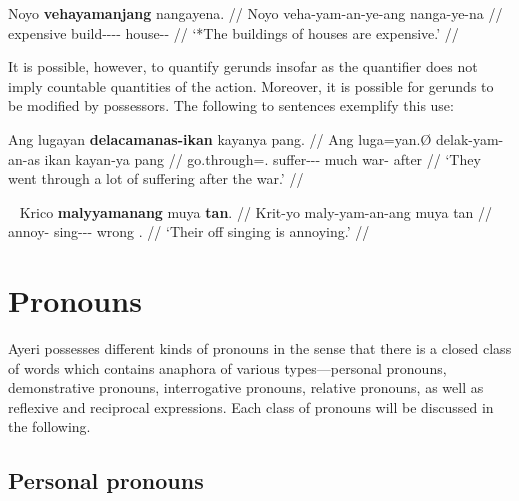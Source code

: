\ex\ljudge* \begingl
	\gla Noyo \textbf{vehayamanjang} nangayena. //
	\glb Noyo veha-yam-an-ye-ang nanga-ye-na //
	\glc expensive build-\Ptcp{}-\Nmlz{}-\Pl{}-\Aarg{} house-\Pl{}-\Gen{} //
	\glft `*The buildings of houses are expensive.' //
\endgl\xe

It is possible, however, to quantify gerunds insofar as the quantifier does not
imply countable quantities of the action. Moreover, it is possible for gerunds
to be modified by possessors. The following to sentences exemplify this use:

\ex\begingl
	\gla Ang lugayan \textbf{delacamanas-ikan} kayanya pang. //
	\glb Ang luga=yan.Ø {delak-yam-an-as ikan} kayan-ya pang //
	\glc \AgtT{} go.through=\TplM{}.\Top{} 
		{suffer-\Ptcp{}-\Nmlz{}-\Parg{} much} war-\Loc{} after //
	\glft `They went through a lot of suffering after the war.' //
\endgl\xe

\ex~\begingl
	\gla Krico \textbf{malyyamanang} muya \textbf{tan}. //
	\glb Krit-yo maly-yam-an-ang muya tan //
	\glc annoy-\TsgN{} sing-\Ptcp{}-\Nmlz{}-\Aarg{} wrong \TplM{}.\Gen{} //
	\glft `Their off singing is annoying.' //
\endgl\xe



\section{Pronouns}

Ayeri possesses different kinds of pronouns in the sense that there is a closed
class of words which contains anaphora of various types---personal pronouns,
demonstrative pronouns, interrogative pronouns, relative pronouns, as well as
reflexive and reciprocal expressions. Each class of pronouns will be discussed
in the following.

\subsection{Personal pronouns}
\label{subsec:perspro}

